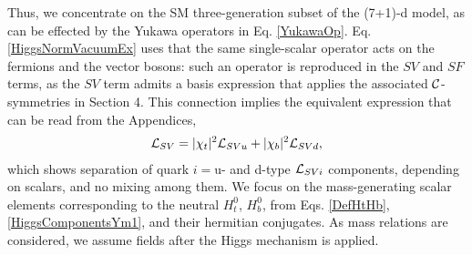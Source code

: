 \documentclass[12pt]{article}
\renewcommand\[{\begin{dmath}}
\renewcommand\]{\end{dmath}}
\newcommand{\boldmathphi}{\mbox{\boldmath$\phi$\unboldmath}}
\begin{document}
   Thus, we concentrate on the SM three-generation subset of the (7+1)-d model\cite{Romero},  as can be effected by the  Yukawa  operators in Eq. \ref{YukawaOp}.
Eq. \ref{HiggsNormVacuumEx} uses that the same single-scalar operator  acts on the  fermions and    the vector bosons:
 such an operator is reproduced in the  $SV$  and $SF$ terms, as the $SV$ term admits a basis expression that applies the associated ${ \cal C }$-symmetries in Section 4.
This  connection implies  the equivalent expression  that  can be read from the Appendices,    \begin{eqnarray}
\label  {YukawaSVextend} {\cal L}_{SV}= {|\chi_t|^2  {\cal L}_{SVu}+|\chi_b|^2 {\cal L}_{SVd}},  \end{eqnarray}
which shows separation    of quark $i=$u- and d-type  ${\cal L}_{SVi}$  components,  depending on scalars,  and no mixing among them.
 We focus on the mass-generating scalar elements corresponding to the neutral $H_t^0$, $H_b^0$, from Eqs. \ref{DefHtHb}, \ref{HiggsComponentsYm1}, and their hermitian conjugates. As mass relations are considered,
we assume fields  after the Higgs mechanism is applied.
\end{document}
